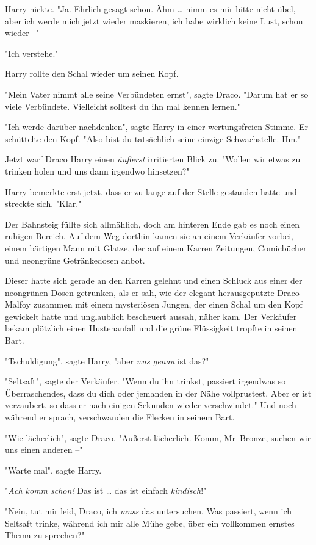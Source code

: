 {Harry nickte. "Ja. Ehrlich gesagt schon. Ähm … nimm es mir bitte nicht übel, aber ich werde mich jetzt wieder maskieren, ich habe wirklich keine Lust, schon wieder --"

"Ich verstehe."

Harry rollte den Schal wieder um seinen Kopf.

"Mein Vater nimmt alle seine Verbündeten ernst", sagte Draco. "Darum hat er so viele Verbündete. Vielleicht solltest du ihn mal kennen lernen."

"Ich werde darüber nachdenken", sagte Harry in einer wertungsfreien Stimme. Er schüttelte den Kopf. "Also bist du tatsächlich seine einzige Schwachstelle. Hm."

Jetzt warf Draco Harry einen \emph{äußerst} irritierten Blick zu. "Wollen wir etwas zu trinken holen und uns dann irgendwo hinsetzen?"

Harry bemerkte erst jetzt, dass er zu lange auf der Stelle gestanden hatte und streckte sich. "Klar."

Der Bahnsteig füllte sich allmählich, doch am hinteren Ende gab es noch einen ruhigen Bereich. Auf dem Weg dorthin kamen sie an einem Verkäufer vorbei, einem bärtigen Mann mit Glatze, der auf einem Karren Zeitungen, Comicbücher und neongrüne Getränkedosen anbot.

Dieser hatte sich gerade an den Karren gelehnt und einen Schluck aus einer der neongrünen Dosen getrunken, als er sah, wie der elegant herausgeputzte Draco Malfoy zusammen mit einem mysteriösen Jungen, der einen Schal um den Kopf gewickelt hatte und unglaublich bescheuert aussah, näher kam. Der Verkäufer bekam plötzlich einen Hustenanfall und die grüne Flüssigkeit tropfte in seinen Bart.

"Tschuldigung", sagte Harry, "aber \emph{was genau} ist das?"

"Seltsaft", sagte der Verkäufer. "Wenn du ihn trinkst, passiert irgendwas so Überraschendes, dass du dich oder jemanden in der Nähe vollprustest. Aber er ist verzaubert, so dass er nach einigen Sekunden wieder verschwindet." Und noch während er sprach, verschwanden die Flecken in seinem Bart.

"Wie lächerlich", sagte Draco. "Äußerst lächerlich. Komm, Mr~Bronze, suchen wir uns einen anderen --"

"Warte mal", sagte Harry.

"\emph{Ach komm schon!} Das ist … das ist einfach \emph{kindisch}!"

"Nein, tut mir leid, Draco, ich \emph{muss} das untersuchen. Was passiert, wenn ich Seltsaft trinke, während ich mir alle Mühe gebe, über ein vollkommen ernstes Thema zu sprechen?"

}
